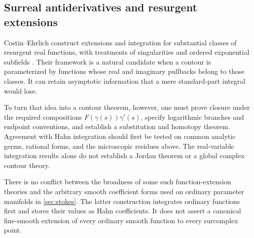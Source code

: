 \documentclass[11pt,letterpaper]{article}
\theoremstyle{definition}
\theoremstyle{remark}
\numberwithin{equation}{section}
\begin{document}
\subsection{Surreal antiderivatives and resurgent extensions}
Costin--Ehrlich construct extensions and integration for substantial classes of resurgent real functions, with treatments of singularities and ordered exponential subfields \cite{CE}. Their framework is a natural candidate when a contour is parameterized by functions whose real and imaginary pullbacks belong to those classes. It can retain asymptotic information that a mere standard-part integral would lose.

To turn that idea into a contour theorem, however, one must prove closure under the required compositions $F(\gamma(s))\gamma'(s)$, specify logarithmic branches and endpoint conventions, and establish a substitution and homotopy theorem. Agreement with Hahn integration should first be tested on common analytic germs, rational forms, and the microscopic residues above. The real-variable integration results alone do not establish a Jordan theorem or a global complex contour theory.

There is no conflict between the broadness of some such function-extension theories and the arbitrary smooth coefficient forms used on ordinary parameter manifolds in \cref{sec:stokes}. The latter construction integrates ordinary functions first and stores their values as Hahn coefficients. It does not assert a canonical fine-smooth extension of every ordinary smooth function to every surcomplex point.
\end{document}
